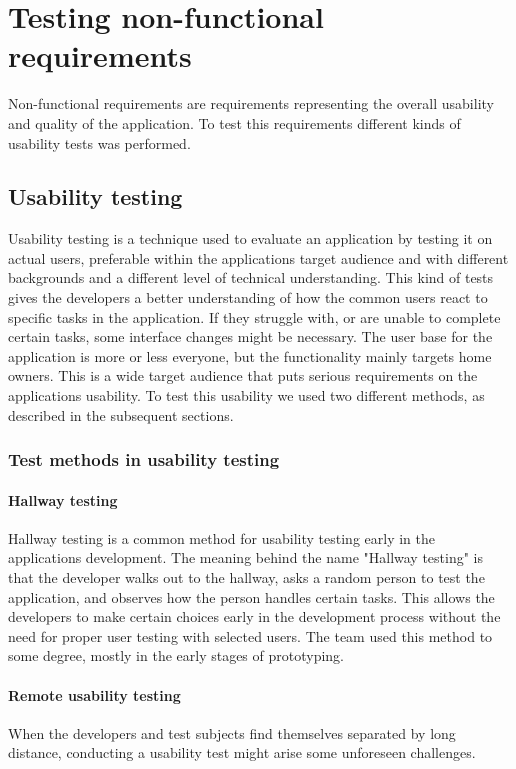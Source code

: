 \section{Testing non-functional requirements}
\label{sec:testingnonfunctionalrequirements}
Non-functional requirements are requirements representing the overall usability and quality of the application. To test this requirements different kinds of usability tests was performed.

\subsection{Usability testing}
\label{sec:userTest}

Usability testing is a technique used to evaluate an application by testing it on actual users, preferable within the applications target audience and with different backgrounds and a different level of technical understanding. This kind of tests gives the developers a better understanding of how the common users react to specific tasks in the application. If they struggle with, or are unable to complete certain tasks, some interface changes might be necessary.
The user base for the application is more or less everyone, but the functionality mainly targets home owners. This is a wide target audience that puts serious requirements on the applications usability. To test this usability we used two different methods, as described in the subsequent sections.

\subsubsection{Test methods in usability testing}

\paragraph{Hallway testing}
Hallway testing is a common method for usability testing early in the applications development. The meaning behind the name "Hallway testing" is that the developer walks out to the hallway, asks a random person to test the application, and observes how the person handles certain tasks. This allows the developers to make certain choices early in the development process without the need for proper user testing with selected users. 
The team used this method to some degree, mostly in the early stages of prototyping.

\paragraph{Remote usability testing}
When the developers and test subjects find themselves separated by long distance, conducting a usability test might arise some unforeseen challenges.

